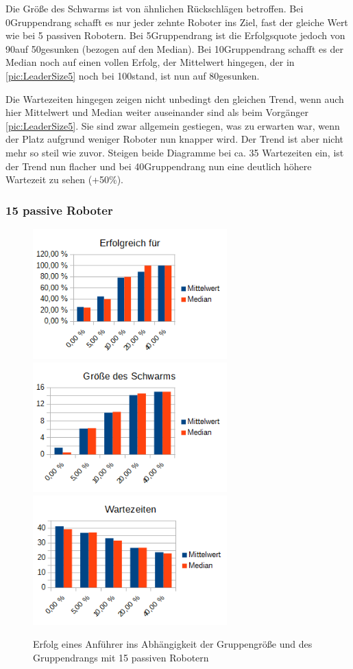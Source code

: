 Die Größe des Schwarms ist von ähnlichen Rückschlägen betroffen. Bei 0\per Gruppendrang schafft es nur jeder zehnte Roboter ins Ziel, fast der gleiche Wert wie bei 5 passiven Robotern. Bei 5\per Gruppendrang ist die Erfolgsquote jedoch von 90\per auf 50\per gesunken (bezogen auf den Median).
Bei 10\per Gruppendrang schafft es der Median noch auf einen vollen Erfolg, der Mittelwert hingegen, der in \autoref{pic:LeaderSize5} noch bei 100\per stand, ist nun auf 80\per gesunken.

Die Wartezeiten hingegen zeigen nicht unbedingt den gleichen Trend, wenn auch hier Mittelwert und Median weiter auseinander sind als beim Vorgänger \autoref{pic:LeaderSize5}. Sie sind zwar allgemein gestiegen, was zu erwarten war, wenn der Platz aufgrund weniger Roboter nun knapper wird. Der Trend ist aber nicht mehr so steil wie zuvor. Steigen beide Diagramme bei ca. 35 Wartezeiten ein, ist der Trend nun flacher und bei 40\per Gruppendrang nun eine deutlich höhere Wartezeit zu sehen (+50\%).

\subsubsection*{15 passive Roboter}

\begin{figure}[h]
	\includegraphics[width=7.5cm, keepaspectratio]{graphics/Statistics/Leader/FlockSize/15_1.png}
	\includegraphics[width=7.5cm, keepaspectratio]{graphics/Statistics/Leader/FlockSize/15_2.png}
	\includegraphics[width=7.5cm, keepaspectratio]{graphics/Statistics/Leader/FlockSize/15_3.png}
	\caption{Erfolg eines Anführer ins Abhängigkeit der Gruppengröße und des Gruppendrangs mit 15 passiven Robotern}
	\label{pic:LeaderSize15}
\end{figure}


